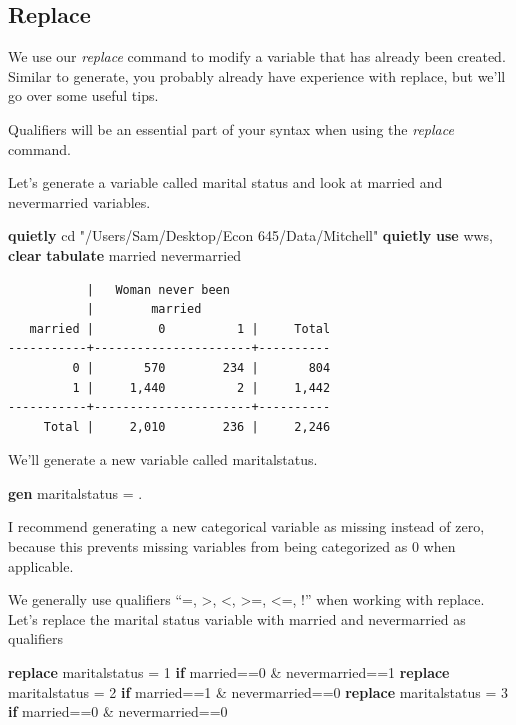\documentclass[
]{book}
\newenvironment{Shaded}{\begin{snugshade}}{\end{snugshade}}
\newcommand{\KeywordTok}[1]{\textcolor[rgb]{0.13,0.29,0.53}{\textbf{#1}}}
\newcommand{\NormalTok}[1]{#1}
\newcommand{\StringTok}[1]{\textcolor[rgb]{0.31,0.60,0.02}{#1}}
\begin{document}
\subsection{Replace}\label{replace}

We use our \emph{replace} command to modify a variable that has already been created. Similar to generate, you probably already have experience with replace, but we'll go over some useful tips.

Qualifiers will be an essential part of your syntax when using the \emph{replace} command.

Let's generate a variable called marital status and look at married and nevermarried variables.

\begin{Shaded}
\begin{Highlighting}[]
\KeywordTok{quietly}\NormalTok{ cd }\StringTok{"/Users/Sam/Desktop/Econ 645/Data/Mitchell"}
\KeywordTok{quietly} \KeywordTok{use}\NormalTok{ wws, }\KeywordTok{clear}
\KeywordTok{tabulate}\NormalTok{ married nevermarried}
\end{Highlighting}
\end{Shaded}

\begin{verbatim}
           |   Woman never been
           |        married
   married |         0          1 |     Total
-----------+----------------------+----------
         0 |       570        234 |       804 
         1 |     1,440          2 |     1,442 
-----------+----------------------+----------
     Total |     2,010        236 |     2,246 
\end{verbatim}

We'll generate a new variable called maritalstatus.

\begin{Shaded}
\begin{Highlighting}[]
\KeywordTok{gen}\NormalTok{ maritalstatus = .}
\end{Highlighting}
\end{Shaded}

I recommend generating a new categorical variable as missing instead of zero, because this prevents missing variables from being categorized as 0 when applicable.

We generally use qualifiers ``=, \textgreater, \textless, \textgreater=, \textless=, !'' when working with replace. Let's replace the marital status variable with married and nevermarried as qualifiers

\begin{Shaded}
\begin{Highlighting}[]
\KeywordTok{replace}\NormalTok{ maritalstatus = 1 }\KeywordTok{if}\NormalTok{ married==0 \& nevermarried==1}
\KeywordTok{replace}\NormalTok{ maritalstatus = 2 }\KeywordTok{if}\NormalTok{ married==1 \& nevermarried==0}
\KeywordTok{replace}\NormalTok{ maritalstatus = 3 }\KeywordTok{if}\NormalTok{ married==0 \& nevermarried==0}
\end{Highlighting}
\end{Shaded}
\end{document}
